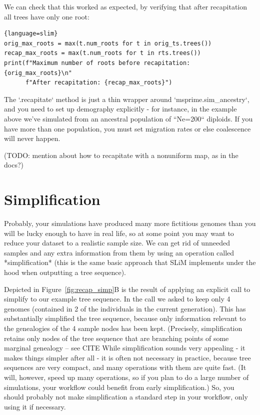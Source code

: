 \documentclass[12pt]{article}
\begin{document}
We can check that this worked as expected, by verifying that after recapitation
all trees have only one root:
\begin{lstlisting}{language=slim}
orig_max_roots = max(t.num_roots for t in orig_ts.trees())
recap_max_roots = max(t.num_roots for t in rts.trees())
print(f"Maximum number of roots before recapitation: {orig_max_roots}\n"
      f"After recapitation: {recap_max_roots}")
\end{lstlisting}

The `.recapitate` method
is just a thin wrapper around `msprime.sim\_ancestry`,
and you need to set up demography explicitly - for instance, in the example above
we've simulated from an ancestral population of ``Ne=200`` diploids.
If you have more than one population,
you must set migration rates or else coalescence will never happen.

(TODO: mention about how to recapitate with a nonuniform map, as in the docs?)


\section{Simplification}


Probably, your simulations have produced many more fictitious genomes
than you will be lucky enough to have in real life,
so at some point you may want to reduce your dataset to a realistic sample size.
We can get rid of unneeded samples and any extra information from them by using
an operation called *simplification* (this is the same basic approach that SLiM
implements under the hood when outputting a tree sequence).

Depicted in Figure~\ref{fig:recap_simp}B is the result of applying an explicit call to
simplify to our example tree sequence.
In the call we asked to keep only 4
genomes (contained in 2 of the individuals in the current generation). This has
substantially simplified the tree sequence, because only information relevant to the
genealogies of the 4 sample nodes has been kept. (Precisely, simplification retains only
nodes of the tree sequence that are branching points of some marginal genealogy -- see
CITE %
While simplification sounds very appealing - it makes things simpler after all -
it is often not necessary in practice, because tree sequences are very compact,
and many operations with them are quite fast.
(It will, however, speed up many operations, so if you plan to do a large number of simulations,
your workflow could benefit from early simplification.)
So, you should probably not make simplification a standard step in your workflow,
only using it if necessary.
\end{document}
